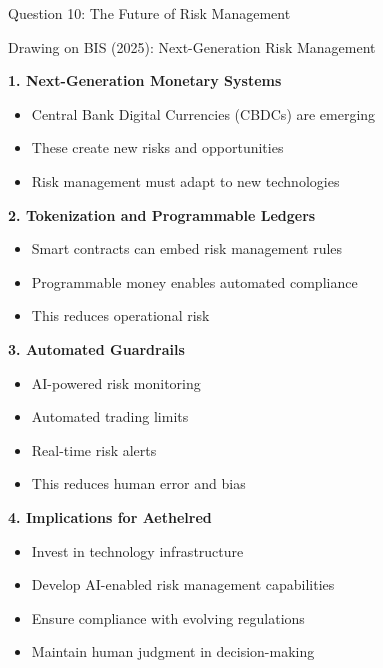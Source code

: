 \documentclass[aspectratio=169]{beamer}
\newcommand{\subquestion}[1]{{\bfseries\color{darkgreen}#1}}
\begin{document}
	\begin{frame}{Question 10: The Future of Risk Management}
		
		\begin{block}{Drawing on BIS (2025): Next-Generation Risk Management}
			
			\subquestion{1. Next-Generation Monetary Systems}
			\begin{itemize}
				\item Central Bank Digital Currencies (CBDCs) are emerging
				\item These create new risks and opportunities
				\item Risk management must adapt to new technologies
			\end{itemize}
			
			\subquestion{2. Tokenization and Programmable Ledgers}
			\begin{itemize}
				\item Smart contracts can embed risk management rules
				\item Programmable money enables automated compliance
				\item This reduces operational risk
			\end{itemize}
			
			\subquestion{3. Automated Guardrails}
			\begin{itemize}
				\item AI-powered risk monitoring
				\item Automated trading limits
				\item Real-time risk alerts
				\item This reduces human error and bias
			\end{itemize}
			
			\subquestion{4. Implications for Aethelred}
			\begin{itemize}
				\item Invest in technology infrastructure
				\item Develop AI-enabled risk management capabilities
				\item Ensure compliance with evolving regulations
				\item Maintain human judgment in decision-making
			\end{itemize}
		\end{block}
	\end{frame}
	
\end{document}
